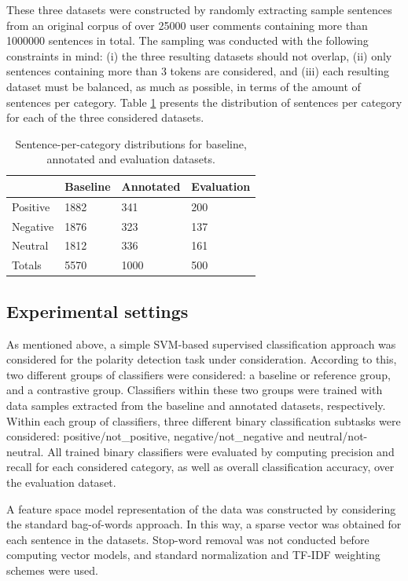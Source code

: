 \documentclass[11pt,letterpaper]{article}
\begin{document}
These three datasets were constructed by randomly extracting sample sentences from an original corpus
of over 25000 user comments containing more than 1000000 sentences in total. The sampling was conducted 
with the following constraints in mind: (i) the three resulting datasets should not overlap, (ii) only sentences 
containing more than 3 tokens are considered, and (iii) each resulting dataset must be balanced, as much
as possible, in terms of the amount of sentences per category. Table \ref{tc_corpus} presents the
distribution of sentences per category for each of the three considered datasets.  

\begin{table}
\begin{tabular}{|l|l|l|l|}
\hline
&Baseline &Annotated &Evaluation \\
\hline
Positive &1882 &341 &200 \\
\hline
Negative &1876 &323 &137 \\
\hline
Neutral &1812 &336 &161 \\
\hline
Totals &5570 &1000 &500 \\
\hline
\end{tabular}
\caption{Sentence-per-category distributions for baseline, annotated and evaluation datasets.}
\label{tc_corpus}
\end{table}

\subsection{Experimental settings}
As mentioned above, a simple SVM-based supervised classification approach was considered for the
polarity detection task under consideration. According to this, two different groups of classifiers were 
considered: a baseline or reference group, and a contrastive group. Classifiers within these two groups were
trained with data samples extracted from the baseline and annotated datasets, respectively. Within each group 
of classifiers, three different binary classification subtasks were considered: positive/not\_positive, 
negative/not\_negative and neutral/not-neutral. All trained binary classifiers were evaluated by computing 
precision and recall for each considered category, as well as overall classification accuracy, over the 
evaluation dataset.

A feature space model representation of the data was constructed by considering the standard bag-of-words approach. 
In this way, a sparse vector was obtained for each sentence in the datasets. Stop-word removal was not
conducted before computing vector models, and standard normalization and TF-IDF weighting schemes were used.
\end{document}
